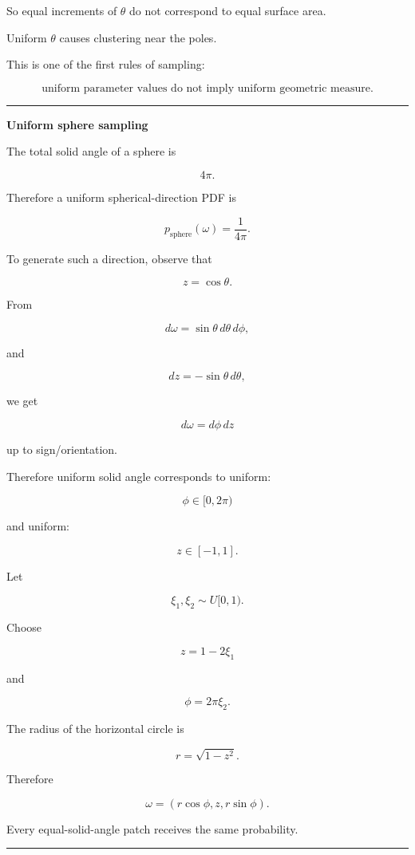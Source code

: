 So equal increments of \(\theta\) do not correspond to equal surface area.

Uniform \(\theta\) causes clustering near the poles.

This is one of the first rules of sampling:

\[
\boxed{
\text{uniform parameter values do not imply uniform geometric measure.}
}
\]

\begin{center}\rule{0.5\linewidth}{0.5pt}\end{center}

\textbf{Uniform sphere sampling}

The total solid angle of a sphere is

\[
4\pi.
\]

Therefore a uniform spherical-direction PDF is

\[
\boxed{
p_{\text{sphere}}(\omega)
=
\frac{1}{4\pi}.
}
\]

To generate such a direction, observe that

\[
z=\cos\theta.
\]

From

\[
d\omega
=
\sin\theta\,d\theta\,d\phi,
\]

and

\[
dz=-\sin\theta\,d\theta,
\]

we get

\[
d\omega=d\phi\,dz
\]

up to sign/orientation.

Therefore uniform solid angle corresponds to uniform:

\[
\phi\in[0,2\pi)
\]

and uniform:

\[
z\in[-1,1].
\]

Let

\[
\xi_1,\xi_2\sim U[0,1).
\]

Choose

\[
\boxed{
z=1-2\xi_1
}
\]

and

\[
\boxed{
\phi=2\pi\xi_2.
}
\]

The radius of the horizontal circle is

\[
r=\sqrt{1-z^2}.
\]

Therefore

\[
\boxed{
\omega=
\left(
r\cos\phi,
z,
r\sin\phi
\right).
}
\]

Every equal-solid-angle patch receives the same probability.

\begin{center}\rule{0.5\linewidth}{0.5pt}\end{center}

